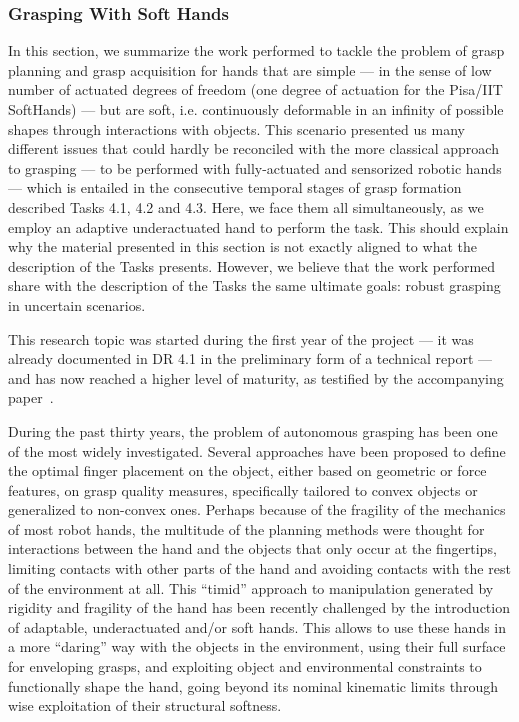 
\subsubsection{Grasping With Soft Hands}
\label{sec:GraspingWithSoftHands}
In this section, we summarize the work performed to tackle the problem of grasp planning and grasp acquisition for hands that are simple --- in the sense of low number of actuated degrees of freedom (one degree of actuation for the Pisa/IIT SoftHands) --- but are soft, i.e. continuously deformable in an infinity of possible shapes through interactions with objects. This scenario presented us many different issues that could hardly be reconciled with the more classical approach to grasping --- to be performed with fully-actuated and sensorized robotic hands --- which is entailed in the consecutive temporal stages of grasp formation described Tasks 4.1, 4.2 and 4.3. Here, we face them all simultaneously, as we employ an adaptive underactuated hand to perform the task. This should explain why the material presented in this section is not exactly aligned to what the description of the Tasks presents. However, we believe that the work performed share with the description of the Tasks the same ultimate goals: robust grasping in uncertain scenarios.

 This research topic was started during the first year of the project --- it was already documented in DR 4.1 in the preliminary form of a technical report --- and has now reached a higher level of maturity, as testified by the accompanying paper~\cite{Bonilla:Humanoids:2015}.

During the past thirty years, the problem of autonomous grasping has been one of the most widely investigated. Several approaches have been proposed to define the optimal finger placement on the object, either based on geometric or force features, on grasp quality measures, specifically tailored to convex objects or generalized to non-convex ones. Perhaps because of the fragility of the mechanics of most robot hands, the multitude of the planning methods were thought for interactions between the hand and the objects that only occur at the fingertips, limiting contacts with other parts of the hand and avoiding contacts with the rest of the environment at all. This ``timid'' approach to manipulation generated by rigidity and fragility of the hand has been recently challenged by the introduction of adaptable, underactuated and/or soft hands. This allows to use these hands in a more ``daring'' way with the objects in the environment, using their full surface for enveloping grasps, and exploiting object and environmental constraints to functionally shape the hand, going beyond its nominal kinematic limits through wise exploitation of their structural softness.

